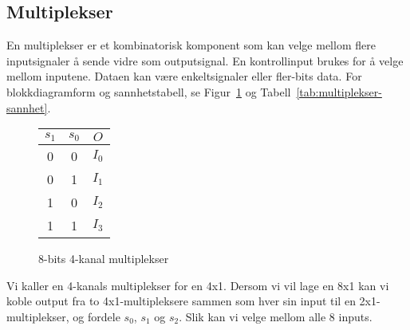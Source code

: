 \documentclass[12pt,a4paper,norsk]{article}
\begin{document}
\subsection{Multiplekser}
En multiplekser er et kombinatorisk komponent som kan velge mellom flere inputsignaler å sende
vidre som outputsignal. En kontrollinput brukes for å velge mellom inputene. 
Dataen kan være enkeltsignaler eller fler-bits data. For blokkdiagramform og sannhetstabell, se
Figur~\ref{fig:multiplekser-blokk} og Tabell~\ref{tab:multiplekser-sannhet}.
\begin{figure}[hbt!]
  \centering
  \begin{minipage}{0.6\textwidth}
    \centering
    \caption{8-bits 4-kanal multiplekser\label{fig:multiplekser-blokk}}
  \end{minipage}
  \begin{minipage}{0.3\textwidth}
    \centering
    \begin{tabular}{cc|c}
      \toprule
      $s_1$ & $s_0$ & $O$ \\
      \midrule
      0 & 0 & $I_0$ \\
      0 & 1 & $I_1$ \\
      1 & 0 & $I_2$ \\
      1 & 1 & $I_3$ \\
      \bottomrule
    \end{tabular}
  \end{minipage}
\end{figure}

Vi kaller en 4-kanals multiplekser for en 4x1. Dersom vi vil lage en
8x1 kan vi koble output fra to 4x1-multipleksere sammen som hver sin
input til en 2x1-multiplekser, og fordele $s_0$, $s_1$ og $s_2$. Slik
kan vi velge mellom alle 8 inputs.
\end{document}
